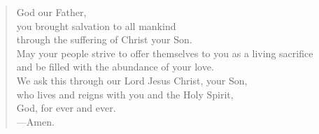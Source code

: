 \prayer

\setlength{\leftmargini}{\prayerleftmargini}

\begin{verse}
God our Father,\\
you brought salvation to all mankind\\
through the suffering of Christ your Son.\\
May your people strive to offer themselves to you as a living sacrifice\\
and be filled with the abundance of your love.\\
We ask this through our Lord Jesus Christ, your Son,\\
who lives and reigns with you and the Holy Spirit,\\
God, for ever and ever.\\
{\color{red}---\thinspace}Amen.
\end{verse}

\setlength{\leftmargini}{\defleftmargini}